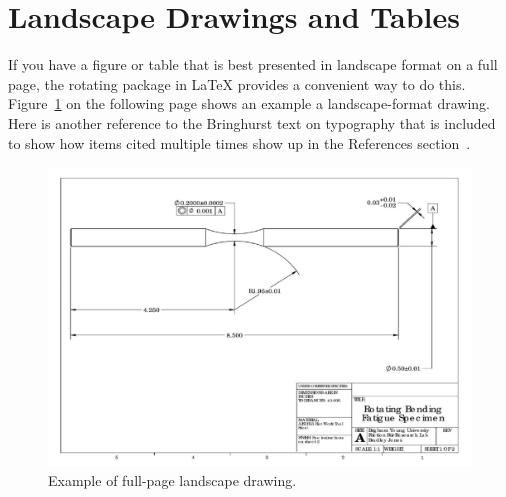 \section{Landscape Drawings and Tables}
If you have a figure or table that is best presented in landscape format on a full page, the {\ttfamily rotating} package in \LaTeX{} provides a convenient way to do this. Figure~\ref{fig:landscape_dwg} on the following page shows an example a landscape-format drawing. Here is another reference to the Bringhurst text on typography that is included to show how items cited multiple times show up in the References section~.
\begin{figure}
	\centering
	\vspace{1.7in} %
	\includegraphics[width=1.0\textwidth]{figures/part_dwg_landscape.pdf}
	\caption{Example of full-page landscape drawing.}
	\label{fig:landscape_dwg}	
\end{figure}


